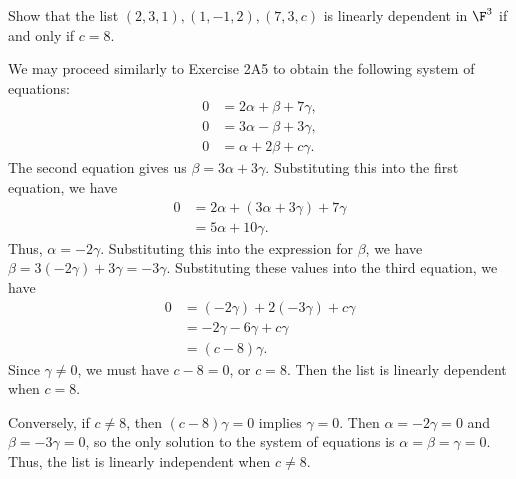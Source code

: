 \begin{exercise}
Show that the list $(2,3,1),(1,-1,2),(7,3,c)$ is linearly dependent in $\F^3$
if and only if $c=8$.
\end{exercise}
\begin{solution}
We may proceed similarly to Exercise 2A5 to obtain the following system of
equations:
\begin{align*}
0 &= 2\alpha+\beta+7\gamma,\\
0 &= 3\alpha-\beta+3\gamma,\\
0 &= \alpha+2\beta+c\gamma.
\end{align*}
The second equation gives us $\beta=3\alpha+3\gamma$. Substituting this into
the first equation, we have
\begin{align*}
0 &= 2\alpha+(3\alpha+3\gamma)+7\gamma\\
  &= 5\alpha+10\gamma.
\end{align*}
Thus, $\alpha=-2\gamma$. Substituting this into the expression for $\beta$, we
have $\beta=3(-2\gamma)+3\gamma=-3\gamma$. Substituting these values into the
third equation, we have
\begin{align*}
0 &= (-2\gamma)+2(-3\gamma)+c\gamma\\
  &= -2\gamma-6\gamma+c\gamma\\
  &= (c-8)\gamma.
\end{align*}
Since $\gamma\ne0$, we must have $c-8=0$, or $c=8$. Then the list is linearly
dependent when $c=8$.

Conversely, if $c\ne8$, then $(c-8)\gamma=0$ implies $\gamma=0$. Then
$\alpha=-2\gamma=0$ and $\beta=-3\gamma=0$, so the only solution to the system
of equations is $\alpha=\beta=\gamma=0$. Thus, the list is linearly
independent when $c\ne8$.
\end{solution}

